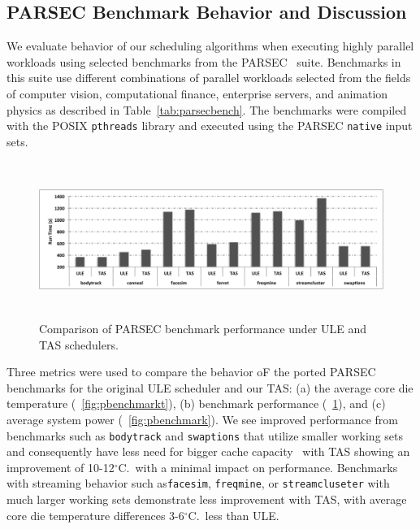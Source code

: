 \documentclass[times, 10pt,twocolumn]{IEEEtran}
\begin{document}
\subsection{PARSEC Benchmark Behavior and Discussion}
\label{sec:mult-behav} We evaluate behavior of our scheduling algorithms
when executing highly parallel workloads using selected benchmarks from
the PARSEC~\cite{Bienia2008} suite. Benchmarks in this suite use
different combinations of parallel workloads selected from the fields of
computer vision, computational finance, enterprise servers, and
animation physics as described in Table~\ref{tab:parsecbench}.  The
benchmarks were compiled with the POSIX \texttt{pthreads} library and
executed using the PARSEC \texttt{native} input sets.

\begin{figure}[!tbp]
  \includegraphics[width=1.0\linewidth,height=2in]{graphics/parsecperformance}
  \caption{Comparison of PARSEC benchmark performance under ULE and TAS
schedulers.}
  \label{fig:pbenchmarkp}
\end{figure} 
Three metrics were used to compare the behavior oF the ported PARSEC
benchmarks for the original ULE scheduler and our TAS: (a) the average
core die temperature (\figurename~\ref{fig:pbenchmarkt}), (b) benchmark
performance (\figurename~\ref{fig:pbenchmarkp}), and (c) average system
power (\figurename~\ref{fig:pbenchmark}).  We see improved performance
from benchmarks such as \texttt{bodytrack} and \texttt{swaptions} that utilize
smaller working sets and consequently have less need for bigger cache
capacity~\cite{Bienia2011} with TAS showing an improvement of
10-12$^{\circ}$C.\ with a minimal impact on performance.  Benchmarks
with streaming behavior such as\texttt{facesim}, \texttt{freqmine}, or
\texttt{streamcluseter} with much larger working sets demonstrate less
improvement with TAS, with average core die temperature differences 3-6$^{\circ}$C.\ less
than ULE.
\end{document}
